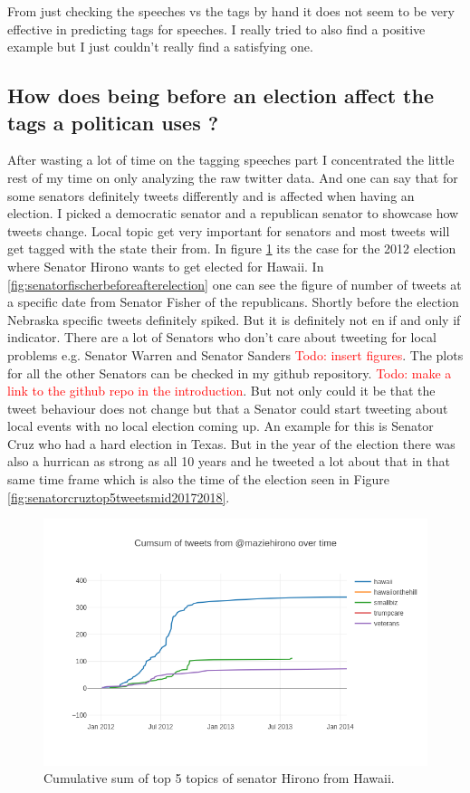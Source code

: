 \documentclass[10pt,conference,compsocconf]{IEEEtran}
\newcommand\todo[1]{\textcolor{red}{Todo: #1}}
\begin{document}
From just checking the speeches vs the tags by hand it does not seem to be very effective in predicting tags for speeches. 
I really tried to also find a positive example but I just couldn't really find a satisfying one.

 
\subsection{How does being before an election affect the tags a politican uses ? }
After wasting a lot of time on the tagging speeches part I concentrated the little rest of my time on only analyzing the raw twitter data. And one can say that for some senators definitely tweets differently and is affected when having an election. I picked a democratic senator and a republican senator to showcase how tweets change. Local topic get very important for senators and most tweets will get tagged with the state their from. In figure \ref{fig:hironobeforeafterelection} its the case for the 2012 election where Senator Hirono wants to get elected for Hawaii. In \ref{fig:senatorfischerbeforeafterelection} one can see the figure of number of tweets at a specific date from Senator Fisher of the republicans. Shortly before the election Nebraska specific tweets definitely spiked. But it is definitely not en if and only if indicator.  There are a lot of Senators who don't care about tweeting for local problems e.g. Senator Warren and Senator Sanders \todo{insert figures}. The plots for all the other Senators can be checked in my github repository. \todo{make a link to the github repo in the introduction}. But not only could it be that the tweet behaviour does not change but that a Senator could start tweeting about local events with no local election coming up. An example for this is Senator Cruz who had a hard election in Texas. But in the year of the election there was also a hurrican as strong as all 10 years and he tweeted a lot about that in that same time frame which is also the time of the election seen in Figure \ref{fig:senatorcruztop5tweetsmid20172018}.
 
\begin{figure}
	\centering
	\includegraphics[width=0.7\linewidth]{images/hirono_before_after_election}
	\caption{Cumulative sum of top 5 topics of senator Hirono from Hawaii. }
	\label{fig:hironobeforeafterelection}
\end{figure}
\end{document}
